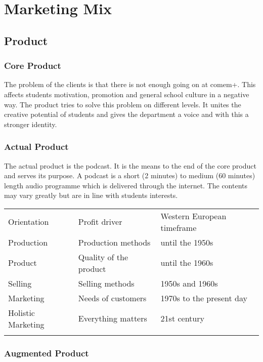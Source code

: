 \chapter{Marketing Mix}

\section{Product}

\subsection{Core Product}

The problem of the clients is that there is not enough going on at
comem+. This affects students motivation, promotion and general school
culture in a negative way. The product tries to solve this problem on
different levels. It unites the creative potential of students and gives
the department a voice and with this a stronger identity.

\subsection{Actual Product}

The actual product is the podcast. It is the means to the end of the
core product and serves its purpose. A podcast is a short (2 minutes) to
medium (60 minutes) length audio programme which is delivered through
the internet. The contents may vary greatly but are in line with
students interests.

\begin{longtable}[c]{@{}lll@{}}
\toprule\addlinespace
Orientation & Profit driver & Western European timeframe
\\\addlinespace
\midrule\endhead
Production & Production methods & until the 1950s
\\\addlinespace
Product & Quality of the product & until the 1960s
\\\addlinespace
Selling & Selling methods & 1950s and 1960s
\\\addlinespace
Marketing & Needs of customers & 1970s to the present day
\\\addlinespace
Holistic Marketing & Everything matters & 21st century
\\\addlinespace
\bottomrule
\end{longtable}

\subsection{Augmented Product}

